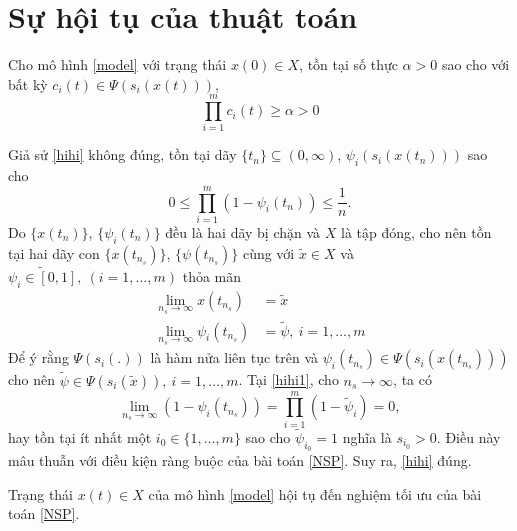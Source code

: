 \section{Sự hội tụ của thuật toán}
\begin{bd}
    \label{bd 2.3.1}
    Cho mô hình \eqref{model} với trạng thái $x(0) \in X$, tồn tại số thực $\alpha > 0 $ sao cho với bất kỳ $c_i(t) \in \Psi(s_i(x(t)))$,
    \begin{equation}
        \label{hihi}
        \prod_{i=1}^m c_i(t) \geq \alpha > 0
    \end{equation}
\end{bd}
\begin{cm}
    Giả sử \eqref{hihi} không đúng, tồn tại dãy $\{t_n\} \subseteq (0, \infty)$, $\psi_i(s_i(x(t_n)))$ sao cho
    \begin{equation}
        \label{hihi1}
        0 \leq \prod_{i=1}^m (1 - \psi_i(t_n)) \leq \dfrac{1}{n}.
    \end{equation}
    Do $\{x(t_n) \}$, $\{\psi_i(t_n) \}$ đều là hai dãy bị chặn và $X$ là tập đóng, cho nên tồn tại hai dãy con $\{ x(t_{n_s})\}$, $\{\psi(t_{n_s})\}$ cùng với $\tilde{x} \in X$ và $\tilde{\psi_i \in [0,1]},\ (i=1, \dots, m)$ thỏa mãn
    \begin{equation}
        \begin{aligned}
            \lim_{n_s \to \infty} x(t_{n_s}) &= \tilde{x} \\
            \lim_{n_s \to \infty} \psi_i(t_{n_s}) &= \tilde{\psi},\ i = 1, \dots, m
        \end{aligned}
    \end{equation}
    Để ý rằng $\Psi(s_i(.))$ là hàm nửa liên tục trên và $\psi_i(t_{n_s}) \in \Psi(s_i(x(t_{n_s})))$ cho nên $\tilde{\psi} \in \Psi(s_i(\tilde{x})),\ i = 1, \dots, m$.
    Tại \eqref{hihi1}, cho $n_s \to \infty$, ta có 
    \begin{equation}
        \lim_{n_s \to \infty}(1 -  \psi_i(t_{n_s})) = \prod_{i=1}^m (1 - \tilde{\psi}_i) = 0,
    \end{equation}
    hay tồn tại ít nhất một $i_0 \in \{1, \dots, m \}$ sao cho $\tilde{\psi}_{i_0} = 1$ nghĩa là $s_{i_0} > 0$. Điều này mâu thuẫn với điều kiện ràng buộc của bài toán \eqref{NSP}. Suy ra, \eqref{hihi} đúng.
\end{cm}

\begin{dl}
    Trạng thái $x(t) \in X$ của mô hình \eqref{model} hội tụ đến nghiệm tối ưu của bài toán \eqref{NSP}.
\end{dl}

